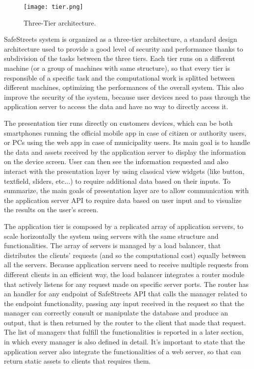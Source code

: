 \begin{figure}[H]
	\centering
	\texttt{[image: tier.png]}
	\caption{Three-Tier architecture.}
\end{figure}

SafeStreets system is organized as a three-tier architecture, a standard design architecture used to provide a good level of security and performance thanks to subdivision of the tasks between the three tiers. Each tier runs on a different machine (or a group of machines with same structure), so that every tier is responsible of a specific task and the computational work is splitted between different machines, optimizing the performances of the overall system. This also improve the security of the system, because user devices need to pass through the application server to access the data and have no way to directly access it. 

The presentation tier runs directly on customers devices, which can be both smartphones running the official mobile app in case of citizen or authority users, or PCs using the web app in case of municipality users. Its main goal is to handle the data and assets received by the application server to display the information on the device screen. User can then see the information requested and also interact with the presentation layer by using classical view widgets (like button, textfield, sliders, etc...) to require additional data based on their inputs. To summarize, the main goals of presentation layer are to allow communication with the application server API to require data based on user input and to visualize the results on the user's screen.

The application tier is composed by a replicated array of application servers, to scale horizontally the system using servers with the same structure and functionalities. The array of servers is managed by a load balancer, that distributes the clients' requests (and so the computational cost) equally between all the servers. Because application servers need to receive multiple requests from different clients in an efficient way, the load balancer integrates a router module that actively listens for any request made on specific server ports. The router has an handler for any endpoint of SafeStreets API that calls the manager related to the endpoint functionality, passing any input received in the request so that the manager can correctly consult or manipulate the database and produce an output, that is then returned by the router to the client that made that request. The list of managers that fulfill the functionalities is reported in a later section, in which every manager is also defined in detail. It's important to state that the application server also integrate the functionalities of a web server, so that can return static assets to clients that requires them.

